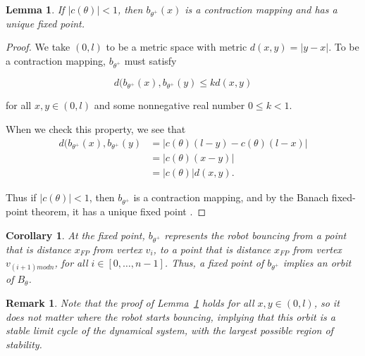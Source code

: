 \documentclass[letterpaper, 10 pt, conference]{ieeeconf}  %
\newtheorem{remark}{\bf Remark}
\newtheorem{corollary}{\bf Corollary}
\newtheorem{lemma}{\bf Lemma}
\begin{document}
\begin{lemma} \label{Lemma:2}
If $|c(\theta)| < 1$, then $b_{\theta^+}(x)$ is a contraction
mapping and has a unique fixed point.
\end{lemma}
\begin{proof}
We take $(0,l)$ to be a metric space with metric $d(x,y) =
|y-x|$. To be a contraction mapping, $b_{\theta^+}$ must satisfy

$$ d(b_{\theta^+}(x), b_{\theta^+}(y) \leq k d(x,y) $$

for all $x, y \in (0,l)$ and some nonnegative real number $0 \leq k < 1$.

When we check this property, we see that
\begin{align*}
d(b_{\theta^+}(x), b_{\theta^+}(y) & = | c(\theta)(l-y) - c(\theta)(l-x)| \\
                               & = | c(\theta) (x-y) | \\
                               & = | c(\theta) | d(x,y).
\end{align*}

Thus if $|c(\theta)| < 1$, then $b_{\theta^+}$ is a contraction mapping, and by the Banach fixed-point
theorem, it has a unique fixed point \cite{Granas2003}.
\end{proof}
\begin{corollary} \label{corollary:sp}
At the fixed point, $b_{\theta^+}$ represents the 
robot bouncing from a point that is distance $x_{FP}$ from vertex $v_i$, to a
point that is distance $x_{FP}$ from vertex $v_{(i+1) mod n}$, for all $i \in
[0,\ldots, n-1]$.
Thus, a fixed point of $b_{\theta^+}$ implies an orbit of $B_\theta$.


\end{corollary}
\begin{remark} \label{rm1}
Note that the proof of Lemma~\ref{Lemma:2} holds for all $x,y \in
(0, l)$, so it does not matter where the robot starts bouncing,
implying that this orbit is a stable limit cycle of the dynamical system, 
with the largest possible region of stability.
\end{remark}
\end{document}
